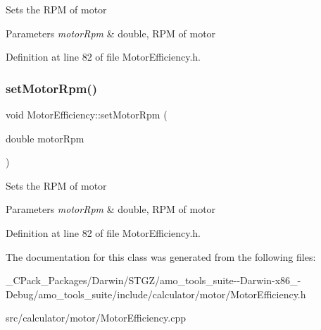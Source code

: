 Sets the R\+PM of motor 
\begin{DoxyParams}{Parameters}
{\em motor\+Rpm} & double, R\+PM of motor \\
\hline
\end{DoxyParams}


Definition at line 82 of file Motor\+Efficiency.\+h.

\mbox{\label{class_motor_efficiency_a2c4ddf9f2f3e44c098dad91a0ddbaf21}} 
\subsubsection{\texorpdfstring{set\+Motor\+Rpm()}{setMotorRpm()}\hspace{0.1cm}{\footnotesize\ttfamily [3/3]}}
{\footnotesize\ttfamily void Motor\+Efficiency\+::set\+Motor\+Rpm (\begin{DoxyParamCaption}\item[{double}]{motor\+Rpm }\end{DoxyParamCaption})\hspace{0.3cm}{\ttfamily [inline]}}

Sets the R\+PM of motor 
\begin{DoxyParams}{Parameters}
{\em motor\+Rpm} & double, R\+PM of motor \\
\hline
\end{DoxyParams}


Definition at line 82 of file Motor\+Efficiency.\+h.



The documentation for this class was generated from the following files\+:\begin{DoxyCompactItemize}
\item 
\+\_\+\+C\+Pack\+\_\+\+Packages/\+Darwin/\+S\+T\+G\+Z/amo\+\_\+tools\+\_\+suite-\/-\/\+Darwin-\/x86\+\_-\/\+Debug/amo\+\_\+tools\+\_\+suite/include/calculator/motor/Motor\+Efficiency.\+h\item 
src/calculator/motor/Motor\+Efficiency.\+cpp\end{DoxyCompactItemize}
